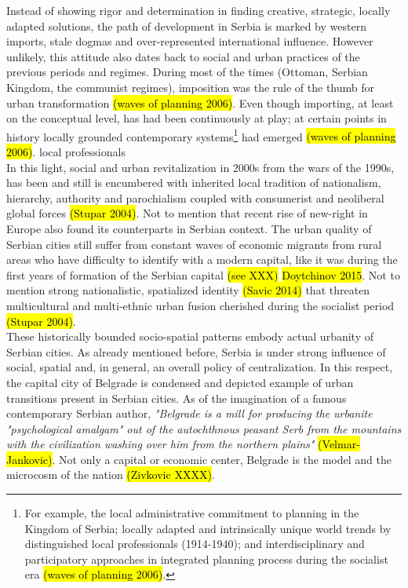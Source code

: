 \documentclass[11pt]{report}
\begin{document}
Instead of showing rigor and determination in finding creative, strategic, locally adapted solutions, the path of development in Serbia is marked by western imports, stale dogmas and over-represented international influence. However unlikely, this attitude also dates back to social and urban practices of the previous periods and regimes. During most of the times (Ottoman, Serbian Kingdom, the communist regimes), imposition was the rule of the thumb for urban transformation \hl{(waves of planning 2006)}. Even though importing, at least on the conceptual level, has had been continuously at play; at certain points in history locally grounded contemporary systems\footnote{For example, the local administrative commitment to planning in the Kingdom of Serbia; locally adapted and intrinsically unique world trends by distinguished local professionals (1914-1940); and interdisciplinary and participatory approaches in integrated planning process during the socialist era \hl{(waves of planning 2006)}.} had emerged \hl{(waves of planning 2006)}.
local professionals  
\\
In this light, social and urban revitalization in 2000s from the wars of the 1990s, has been and still is encumbered with inherited local tradition of nationalism, hierarchy, authority and parochialism coupled with consumerist and neoliberal global forces \hl{(Stupar 2004)}.
Not to mention that recent rise of new-right in Europe also found its counterparts in Serbian context.
The urban quality of Serbian cities still suffer from constant waves of economic migrants from rural areas who have difficulty to identify with a modern capital, like it was during the first years of formation of the Serbian capital \hl{(see XXX)} \hl{Doytchinov 2015}. Not to mention strong nationalistic, spatialized identity \hl{(Savic 2014)} that threaten multicultural and multi-ethnic urban fusion cherished during the socialist period \hl{(Stupar 2004)}.
\\
These historically bounded socio-spatial patterns embody actual urbanity of Serbian cities. As already mentioned before, Serbia is under strong influence of social, spatial and, in general, an overall policy of centralization. In this respect, the capital city of Belgrade is condensed and depicted example of urban transitions present in Serbian cities.
As of the imagination of a famous contemporary Serbian author, \textit{"Belgrade is a mill for producing the urbanite "psychological amalgam" out of the autochthnous peasant Serb from the mountains with the civilization washing over him from the northern plains"} \hl{(Velmar-Jankovic)}. Not only a capital or economic center, Belgrade is the model and the microcosm of the nation \hl{(Zivkovic XXXX)}.
\end{document}
